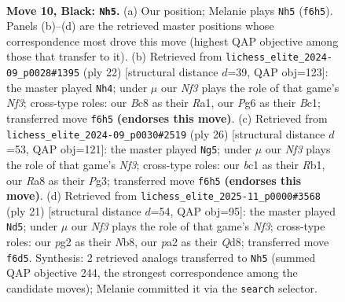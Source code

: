 \documentclass[11pt]{article}
\begin{document}
\clearpage

\begin{figure}[p]\centering
\begin{subfigure}{0.46\textwidth}\centering
\resizebox{\linewidth}{!}{%
\newchessgame
\chessboard[
  setfen={r1bq1rk1/ppp2pbp/3p1np1/8/2PQP3/2N4P/PP2BPP1/R1B2RK1 b - - 0 10},
  showmover=false,
  pgfstyle=straightmove, color=movearrow, markmove={f6-h5}
]}
\caption{}
\end{subfigure}\hfill
\begin{subfigure}{0.46\textwidth}\centering
\resizebox{\linewidth}{!}{%
\newchessgame
\chessboard[
  setfen={2kr1b1r/ppp2ppp/2n3b1/3qp3/6P1/3P1N1P/PPP2PB1/R1BQ1RK1 w - - 1 12},
  showmover=false,
  pgfstyle=straightmove, color=movearrow, markmove={f3-h4}
]}
\caption{}
\end{subfigure}
\\[4pt]
\begin{subfigure}{0.46\textwidth}\centering
\resizebox{\linewidth}{!}{%
\newchessgame
\chessboard[
  setfen={r1b1r1k1/pp4bp/2n3p1/3qpp2/8/3P1NP1/P3PPBP/1RBQ1RK1 w - - 0 14},
  showmover=false,
  pgfstyle=straightmove, color=movearrow, markmove={f3-g5}
]}
\caption{}
\end{subfigure}\hfill
\begin{subfigure}{0.46\textwidth}\centering
\resizebox{\linewidth}{!}{%
\newchessgame
\chessboard[
  setfen={rn1q1rk1/pp3pbp/2pp1np1/8/2PQ1P2/2N3PP/PP3PB1/R1B2RK1 b - - 0 11},
  showmover=false,
  pgfstyle=straightmove, color=movearrow, markmove={f6-d5}
]}
\caption{}
\end{subfigure}
\caption{\textbf{Move 10, Black: \texttt{Nh5}.} (a) Our position; Melanie plays \texttt{Nh5} (\texttt{f6h5}). Panels (b)--(d) are the retrieved master positions whose correspondence most drove this move (highest QAP objective among those that transfer to it). (b) Retrieved from \texttt{lichess\_elite\_2024-09\_p0028\#1395} (ply 22) [structural distance $d$=39, QAP obj=123]: the master played \texttt{Nh4}; under $\mu$ our \emph{Nf3} plays the role of that game's \emph{Nf3}; cross-type roles: our \emph{B}c8 as their \emph{R}a1, our \emph{P}g6 as their \emph{B}c1; transferred move \texttt{f6h5} \textbf{(endorses this move)}. (c) Retrieved from \texttt{lichess\_elite\_2024-09\_p0030\#2519} (ply 26) [structural distance $d$=53, QAP obj=121]: the master played \texttt{Ng5}; under $\mu$ our \emph{Nf3} plays the role of that game's \emph{Nf3}; cross-type roles: our \emph{b}c1 as their \emph{R}b1, our \emph{R}a8 as their \emph{P}g3; transferred move \texttt{f6h5} \textbf{(endorses this move)}. (d) Retrieved from \texttt{lichess\_elite\_2025-11\_p0000\#3568} (ply 21) [structural distance $d$=54, QAP obj=95]: the master played \texttt{Nd5}; under $\mu$ our \emph{Nf3} plays the role of that game's \emph{Nf3}; cross-type roles: our \emph{p}g2 as their \emph{N}b8, our \emph{p}a2 as their \emph{Q}d8; transferred move \texttt{f6d5}. Synthesis: 2 retrieved analogs transferred to \texttt{Nh5} (summed QAP objective 244, the strongest correspondence among the candidate moves); Melanie committed it via the \texttt{search} selector.}
\label{fig:thought-m19}
\end{figure}
\end{document}
